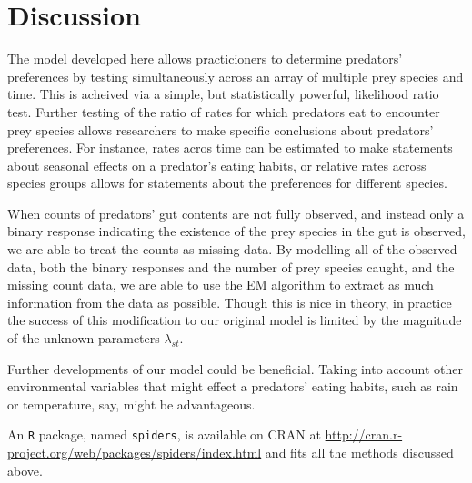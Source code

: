\section{Discussion}
\label{sec:discussion}

The model developed here allows practicioners to determine predators' preferences by testing simultaneously across an array of multiple prey species and time.  This is acheived via a simple, but statistically powerful, likelihood ratio test.  Further testing of the ratio of rates for which predators eat to encounter prey species allows researchers to make specific conclusions about predators' preferences.  For instance, rates acros time can be estimated to make statements about seasonal effects on a predator's eating habits, or relative rates across species groups allows for statements about the preferences for different species.

When counts of predators' gut contents are not fully observed, and instead only a binary response indicating the existence of the prey species in the gut is observed, we are able to treat the counts as missing data.  By modelling all of the observed data, both the binary responses and the number of prey species caught, and the missing count data, we are able to use the EM algorithm to extract as much information from the data as possible.  Though this is nice in theory, in practice the success of this modification to our original model is limited by the magnitude of the unknown parameters $\lambda_{st}$.  

Further developments of our model could be beneficial.  Taking into account other environmental variables that might effect a predators' eating habits, such as rain or temperature, say, might be advantageous.  

An \texttt{R} package, named \texttt{spiders}, is available on CRAN at \url{http://cran.r-project.org/web/packages/spiders/index.html} and fits all the methods discussed above.  

